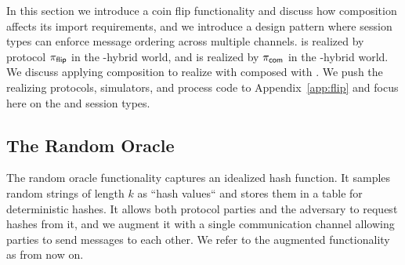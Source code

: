 
In this section we introduce a coin flip functionality \Fflip and discuss how composition affects its import requirements, and we introduce a design pattern where session types can enforce message ordering across multiple channels. 
\Fflip is realized by protocol $\pi_{{\mathsf {flip}}}$ in the \Fcom-hybrid world, and \Fcom is realized by $\pi_{{\mathsf {com}}}$ in the \Fropp-hybrid world.
We discuss applying composition to realize \Fflip with  composed with .
We push the realizing protocols, simulators, and process code to Appendix~\ref{app:flip} and focus here on the \Fflip and \Fropp session types.

\subsection{The Random Oracle}
The random oracle functionality captures an idealized hash function. It samples random strings of length $k$ as ``hash values`` and stores them in a table for deterministic hashes.
It allows both protocol parties and the adversary to request hashes from it, and we augment it with a single communication channel allowing parties to send messages to each other.
We refer to the augmented functionality as \Fropp from now on.

